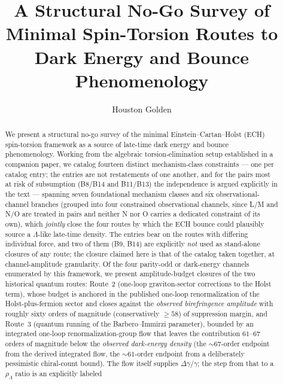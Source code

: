 \documentclass[aps,prd,twocolumn,superscriptaddress,showpacs,preprintnumbers,nofootinbib,longbibliography,floatfix]{revtex4-2}
\begin{document}
\title{A Structural No-Go Survey of Minimal Spin-Torsion Routes to Dark Energy and Bounce Phenomenology}

\author{Houston Golden}


\begin{abstract}
We present a structural no-go survey of the minimal Einstein--Cartan--Holst
(ECH) spin-torsion framework as a source of late-time dark energy and bounce
phenomenology. Working from the algebraic torsion-elimination setup
established in a companion paper, we catalog fourteen distinct
mechanism-class constraints --- one per catalog entry; the entries are
not restatements of one another, and for the pairs most at risk of
subsumption (B8/B14 and B11/B13) the independence is argued explicitly
in the text --- spanning seven foundational mechanism classes
and six observational-channel branches (grouped into four constrained
observational channels, since L/M and N/O are treated in pairs and
neither N nor O carries a dedicated constraint of its own), which
\emph{jointly} close the
four routes by which the ECH bounce could plausibly source a
$\Lambda$-like late-time density. The entries bear on the routes with
differing individual force, and two of them (B9, B14) are explicitly
\emph{not} used as stand-alone closures of any route; the closure claimed
here is that of the catalog taken together, at channel-amplitude
granularity.
Of the four parity-odd or dark-energy channels enumerated by this
framework,
we present amplitude-budget closures of the two historical quantum routes:
Route~2 (one-loop graviton-sector corrections to the Holst term), whose
budget is anchored in the published one-loop renormalization of the
Holst-plus-fermion sector and closes against the \emph{observed
birefringence amplitude} with roughly sixty orders of magnitude
(conservatively $\geq 58$) of suppression margin, and Route~3 (quantum
running of the Barbero--Immirzi parameter), bounded by an integrated
one-loop renormalization-group flow that leaves the contribution
$61$--$67$ orders of magnitude below the \emph{observed dark-energy
density} (the ${\sim}67$-order endpoint from the derived integrated
flow, the ${\sim}61$-order endpoint from a deliberately pessimistic
chiral-count bound). The flow itself supplies $\Delta\gamma/\gamma$; the
step from that to a $\rho_\Lambda$ ratio is an explicitly labeled

\end{abstract}
\end{document}
